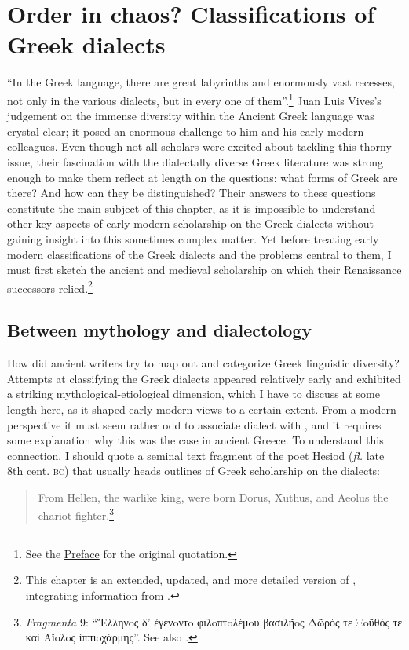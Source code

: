 \chapter{Order in chaos? Classifications of Greek dialects}\label{chap:2}

“In the Greek language, there are great labyrinths and enormously vast recesses, not only in the various dialects, but in every one of them”.\footnote{See the \hyperref[ch:preface]{Preface} for the original quotation.} Juan Luis Vives’s judgement on the immense diversity within the Ancient Greek language was crystal clear; it posed an enormous challenge to him and his early modern colleagues. Even though not all scholars were excited about tackling this thorny issue, their fascination with the dialectally diverse Greek literature was strong enough to make them reflect at length on the questions: what forms of Greek are there? And how can they be distinguished? Their answers to these questions constitute the main subject of this chapter, as it is impossible to understand other key aspects of early modern scholarship on the Greek dialects without gaining insight into this sometimes complex matter. Yet before treating early modern classifications of the Greek dialects and the problems central to them, I must first sketch the ancient and medieval scholarship on which their Renaissance successors relied.\footnote{This chapter is an extended, updated, and more detailed version of \citet{VanRooy2016a}, integrating information from \citet{VanRooy2018b}.}

\section{Between mythology and dialectology}\label{sec:2.1} 

How did ancient writers try to map out and categorize Greek linguistic diversity? Attempts at classifying the Greek dialects appeared relatively early and exhibited a striking mythological-etiological dimension, which I have to discuss at some length here, as it shaped early modern views to a certain extent. From a modern perspective it must seem rather odd to associate dialect with , and it requires some explanation why this was the case in ancient Greece. To understand this connection, I should quote a seminal text fragment of the poet Hesiod (\textit{fl.} late 8th cent. \textsc{bc}) that usually heads outlines of Greek scholarship on the dialects:

\begin{quote}
From Hellen, the warlike king, were born  Dorus, Xuthus, and Aeolus the chariot-fighter.\footnote{\textit{Fragmenta} 9: “Ἕλληνoς δ’ ἐγένoντo φιλoπτoλέμoυ βασιλῆoς {\textbar} Δῶρός τε Ξoῦθός τε καὶ Aἴoλoς ἱππιoχάρμης”. See also \citet[64]{Hainsworth1967}.}
\end{quote}

